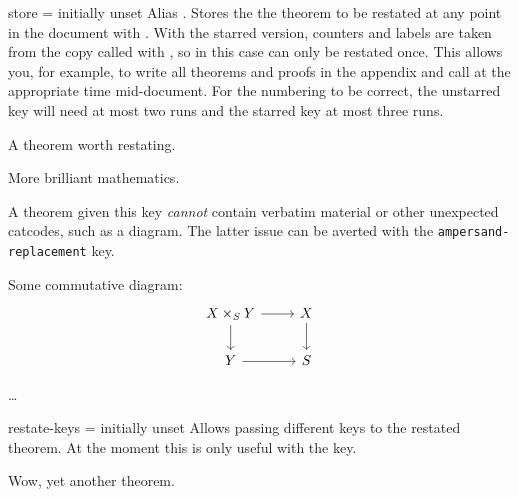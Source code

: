\documentclass{ltxdoc}
\begin{document}
\begin{docKey}{store}
  {\sarg=}
  {initially unset}
Alias \sarg.
Stores the the theorem to be restated at any point in the document with .
With the starred version, counters and labels are taken from the copy called with , so in this case can only be restated once.
This allows you, for example, to write all theorems and proofs in the appendix and call  at the appropriate time mid-document.
For the numbering to be correct, the unstarred key will need at most two runs and the starred key at most three runs.

\begin{keythmscode}[]
\begin{theorem}[store=blub]
A theorem worth restating.
\end{theorem}
More brilliant mathematics.
\end{keythmscode}

A theorem given this key \emph{cannot} contain verbatim material or other unexpected catcodes, such as a  diagram.
The latter issue can be averted with the \texttt{ampersand-replacement} key.

\begin{tcbwritetemp}
\usepackage{tikz}
\usetikzlibrary{cd}
\end{tcbwritetemp}

\begin{keythmscode}[withpreamble]
\begin{lemma}[store=diagram]
Some commutative diagram:
\[\begin{tikzcd}[ampersand replacement=\&]
X\times_S Y \ar[r] \ar[d] \& X \ar[d] \\
Y \ar[r] \& S
\end{tikzcd}\]
\end{lemma}
\dots
{}
\end{keythmscode}

\end{docKey}

\begin{docKey}{restate-keys}
  {=}
  {initially unset}
Allows passing different keys to the restated theorem.
At the moment this is only useful with the  key.

\begin{keythmscode}[]
\begin{theorem}[
  store=rktest,
  note=ORIGINAL,
  restate-keys={note=RESTATED}]
Wow, yet another theorem.
\end{theorem}
\end{keythmscode}

\end{docKey}
\end{document}

